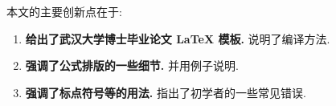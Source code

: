 \begin{innovation}
本文的主要创新点在于:
	\begin{enumerate}[label=(\arabic*)]
		\item  \textbf{给出了武汉大学博士毕业论文 \LaTeX{} 模板.} 说明了编译方法.
		
		\item  \textbf{强调了公式排版的一些细节.} 并用例子说明.
		
		\item  \textbf{强调了标点符号等的用法.} 指出了初学者的一些常见错误.
	\end{enumerate}
\end{innovation}